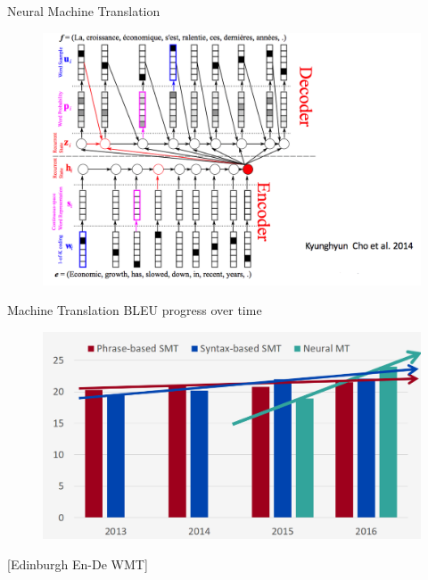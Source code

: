 \documentclass[handout]{beamer}
\begin{document}
\begin{frame}{Neural Machine Translation}
         \begin{figure}[h]
        	\includegraphics[scale = 0.25]{pics/mt.png}
        \end{figure}  
\end{frame}


\begin{frame}{Machine Translation BLEU progress over time}
         \begin{figure}[h]
        	\includegraphics[scale = 0.35]{pics/nmt_progress.png}
        \end{figure}  
[Edinburgh En-De WMT]        
\end{frame}
\end{document}
